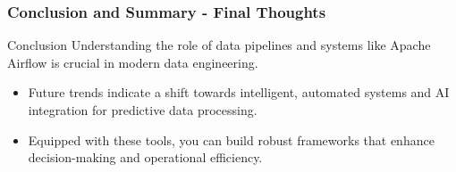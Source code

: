 \documentclass[aspectratio=169]{beamer}
\begin{document}
\begin{frame}[fragile]
  \frametitle{Conclusion and Summary - Final Thoughts}
  \begin{block}{Conclusion}
    Understanding the role of data pipelines and systems like Apache Airflow is crucial in modern data engineering. 
  \end{block}
  
  \begin{itemize}
    \item Future trends indicate a shift towards intelligent, automated systems and AI integration for predictive data processing.
    \item Equipped with these tools, you can build robust frameworks that enhance decision-making and operational efficiency.
  \end{itemize}
\end{frame}
\end{document}
